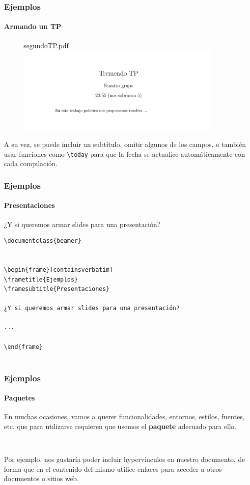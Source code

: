 \begin{frame}
\frametitle{Ejemplos}
\framesubtitle{Armando un TP}

\begin{figure}
segundoTP.pdf
\includegraphics[width=0.9\textwidth]{../images/ejemplo_tp_1.png}
\end{figure}

A su vez, se puede incluir un subtítulo, omitir algunos de los campos, o también usar funciones como \texttt{\textbackslash today} para que la fecha se actualice automáticamente con cada compilación.

\end{frame}

\begin{frame}[containsverbatim]
\frametitle{Ejemplos}
\framesubtitle{Presentaciones}

¿Y si queremos armar slides para una presentación?

\begin{lstlisting}
\documentclass{beamer}


\begin{frame}[containsverbatim]
\frametitle{Ejemplos}
\framesubtitle{Presentaciones}

¿Y si queremos armar slides para una presentación?

...

\end{frame}


\end{lstlisting}

\end{frame}

\begin{frame}
\frametitle{Ejemplos}
\framesubtitle{Paquetes}

En muchas ocasiones, vamos a querer funcionalidades, entornos, estilos, fuentes, etc. que para utilizarse requieren que usemos el \textbf{paquete} adecuado para ello.

\

Por ejemplo, nos gustaría poder incluir hypervínculos en nuestro documento, de forma que en el contenido del mismo utilice enlaces para acceder a otros documentos o sitios web.
\end{frame}

